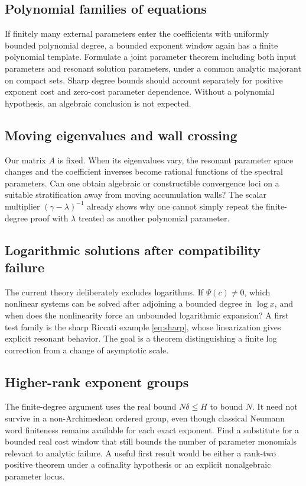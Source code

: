 \documentclass[11pt,a4paper]{article}
\numberwithin{equation}{section}
\theoremstyle{definition}
\theoremstyle{remark}
\begin{document}
\subsection{Polynomial families of equations}
If finitely many external parameters enter the coefficients with uniformly
bounded polynomial degree, a bounded exponent window again has a finite
polynomial template. Formulate a joint parameter theorem including both
input parameters and resonant solution parameters, under a common analytic
majorant on compact sets. Sharp degree bounds should account separately
for positive exponent cost and zero-cost parameter dependence. Without a
polynomial hypothesis, an algebraic conclusion is not expected.

\subsection{Moving eigenvalues and wall crossing}
Our matrix $A$ is fixed. When its eigenvalues vary, the resonant parameter
space changes and the coefficient inverses become rational functions of
the spectral parameters. Can one obtain algebraic or constructible
convergence loci on a suitable stratification away from moving accumulation
walls? The scalar multiplier $(\gamma-\lambda)^{-1}$ already shows why
one cannot simply repeat the finite-degree proof with $\lambda$ treated as
another polynomial parameter.

\subsection{Logarithmic solutions after compatibility failure}
The current theory deliberately excludes logarithms. If $\Psi(c)\ne0$,
which nonlinear systems can be solved after adjoining a bounded degree in
$\log x$, and when does the nonlinearity force an unbounded logarithmic
expansion? A first test family is the sharp Riccati example
\eqref{eq:sharp}, whose linearization gives explicit resonant behavior.
The goal is a theorem distinguishing a finite log correction from a
change of asymptotic scale.

\subsection{Higher-rank exponent groups}
The finite-degree argument uses the real bound $N\delta\leq H$ to bound
$N$. It need not survive in a non-Archimedean ordered group, even though
classical Neumann word finiteness remains available for each exact
exponent. Find a substitute for a bounded real cost window that still
bounds the number of parameter monomials relevant to analytic failure.
A useful first result would be either a rank-two positive theorem under a
cofinality hypothesis or an explicit nonalgebraic parameter locus.
\end{document}
